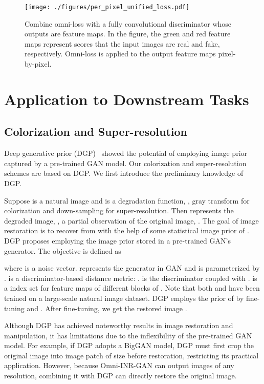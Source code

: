 \documentclass[paper_2425.tex]{subfiles}
\begin{document}
\begin{figure}[t]
  \begin{center}
\texttt{[image: ./figures/per\_pixel\_unified\_loss.pdf]}
  \end{center}
  \vspace{-0.5cm}
  \caption{Combine omni-loss with a fully convolutional discriminator whose outputs are feature maps. In the figure, the green and red feature maps represent scores that the input images are real and fake, respectively. Omni-loss is applied to the output feature maps pixel-by-pixel. }
  \label{apx:fig:per_pixel_omni_loss}
\end{figure}

\section{Application to Downstream Tasks}
\label{apx:sec:downstream_tasks}


\subsection{Colorization and Super-resolution}

Deep generative prior (DGP)~\cite{pan2020Exploiting} showed the potential of employing image prior captured by a pre-trained GAN model. Our colorization and super-resolution schemes are based on DGP. We first introduce the preliminary knowledge of DGP.

Suppose  is a natural image and  is a degradation function, \eg, gray transform for colorization and down-sampling for super-resolution. Then  represents the degraded image, \ie, a partial observation of the original image, . The goal of image restoration is to recover  from  with the help of some statistical image prior of . DGP proposes employing the image prior stored in a pre-trained GAN's generator. The objective is defined as

where  is a noise vector.  represents the generator in GAN and is parameterized by .  is a discriminator-based distance metric: .  is the discriminator coupled with .  is a index set for feature maps of different blocks of . Note that both  and  have been trained on a large-scale natural image dataset. DGP employs the prior of  by fine-tuning  and . After fine-tuning, we get the restored image .


Although DGP has achieved noteworthy results in image restoration and manipulation, it has limitations due to the inflexibility of the pre-trained GAN model. For example, if DGP adopts a  BigGAN model, DGP must first crop the original image into image patch of size  before restoration, restricting its practical application. However, because Omni-INR-GAN can output images of any resolution, combining it with DGP can directly restore the original image.
\end{document}
